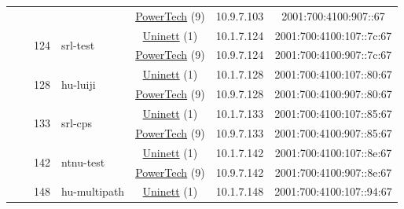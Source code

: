 \begin{small}
\begin{center}
\begin{longtable}{|c|c|c|c|c|c|c|c|}
  &  & \multicolumn{2}{|c|}{} & \multicolumn{2}{|c|}{\tiny{\href{http://www.powertech.no}{PowerTech} (9)}} & \tiny{10.9.7.103} & \tiny{2001:700:4100:907::67} \\* \cline{3-3}\cline{4-4}\cline{5-5}\cline{6-6}\cline{7-7}\cline{8-8}
  &  & \multirow{2}{*}{\tiny{124}} & \multicolumn{1}{|l|}{\multirow{2}{*}{\tiny{srl-test}}} & \multicolumn{2}{|c|}{\tiny{\href{https://www.uninett.no}{Uninett} (1)}} & \tiny{10.1.7.124} & \tiny{2001:700:4100:107::7c:67} \\* \cline{5-5}\cline{6-6}\cline{7-7}\cline{8-8}
  &  &  &  & \multicolumn{2}{|c|}{\tiny{\href{http://www.powertech.no}{PowerTech} (9)}} & \tiny{10.9.7.124} & \tiny{2001:700:4100:907::7c:67} \\* \cline{3-3}\cline{4-4}\cline{5-5}\cline{6-6}\cline{7-7}\cline{8-8}
  &  & \multirow{2}{*}{\tiny{128}} & \multicolumn{1}{|l|}{\multirow{2}{*}{\tiny{hu-luiji}}} & \multicolumn{2}{|c|}{\tiny{\href{https://www.uninett.no}{Uninett} (1)}} & \tiny{10.1.7.128} & \tiny{2001:700:4100:107::80:67} \\* \cline{5-5}\cline{6-6}\cline{7-7}\cline{8-8}
  &  &  &  & \multicolumn{2}{|c|}{\tiny{\href{http://www.powertech.no}{PowerTech} (9)}} & \tiny{10.9.7.128} & \tiny{2001:700:4100:907::80:67} \\* \cline{3-3}\cline{4-4}\cline{5-5}\cline{6-6}\cline{7-7}\cline{8-8}
  &  & \multirow{2}{*}{\tiny{133}} & \multicolumn{1}{|l|}{\multirow{2}{*}{\tiny{srl-cps}}} & \multicolumn{2}{|c|}{\tiny{\href{https://www.uninett.no}{Uninett} (1)}} & \tiny{10.1.7.133} & \tiny{2001:700:4100:107::85:67} \\* \cline{5-5}\cline{6-6}\cline{7-7}\cline{8-8}
  &  &  &  & \multicolumn{2}{|c|}{\tiny{\href{http://www.powertech.no}{PowerTech} (9)}} & \tiny{10.9.7.133} & \tiny{2001:700:4100:907::85:67} \\* \cline{3-3}\cline{4-4}\cline{5-5}\cline{6-6}\cline{7-7}\cline{8-8}
  &  & \multirow{2}{*}{\tiny{142}} & \multicolumn{1}{|l|}{\multirow{2}{*}{\tiny{ntnu-test}}} & \multicolumn{2}{|c|}{\tiny{\href{https://www.uninett.no}{Uninett} (1)}} & \tiny{10.1.7.142} & \tiny{2001:700:4100:107::8e:67} \\* \cline{5-5}\cline{6-6}\cline{7-7}\cline{8-8}
  &  &  &  & \multicolumn{2}{|c|}{\tiny{\href{http://www.powertech.no}{PowerTech} (9)}} & \tiny{10.9.7.142} & \tiny{2001:700:4100:907::8e:67} \\* \cline{3-3}\cline{4-4}\cline{5-5}\cline{6-6}\cline{7-7}\cline{8-8}
  &  & \multirow{2}{*}{\tiny{148}} & \multicolumn{1}{|l|}{\multirow{2}{*}{\tiny{hu-multipath}}} & \multicolumn{2}{|c|}{\tiny{\href{https://www.uninett.no}{Uninett} (1)}} & \tiny{10.1.7.148} & \tiny{2001:700:4100:107::94:67} \\* \cline{5-5}\cline{6-6}\cline{7-7}\cline{8-8}

\end{longtable}
\end{center}
\end{small}
